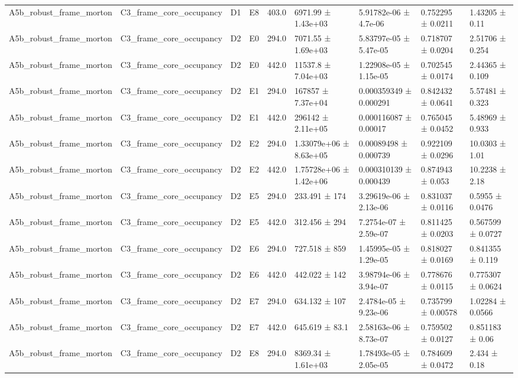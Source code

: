 \begin{table}
\begin{tabular}{lllllllll}
A5b\_robust\_frame\_morton & C3\_frame\_core\_occupancy & D1 & E8 & 403.0 & 6971.99 ± 1.43e+03 & 5.91782e-06 ± 4.7e-06 & 0.752295 ± 0.0211 & 1.43205 ± 0.11 \\
A5b\_robust\_frame\_morton & C3\_frame\_core\_occupancy & D2 & E0 & 294.0 & 7071.55 ± 1.69e+03 & 5.83797e-05 ± 5.47e-05 & 0.718707 ± 0.0204 & 2.51706 ± 0.254 \\
A5b\_robust\_frame\_morton & C3\_frame\_core\_occupancy & D2 & E0 & 442.0 & 11537.8 ± 7.04e+03 & 1.22908e-05 ± 1.15e-05 & 0.702545 ± 0.0174 & 2.44365 ± 0.109 \\
A5b\_robust\_frame\_morton & C3\_frame\_core\_occupancy & D2 & E1 & 294.0 & 167857 ± 7.37e+04 & 0.000359349 ± 0.000291 & 0.842432 ± 0.0641 & 5.57481 ± 0.323 \\
A5b\_robust\_frame\_morton & C3\_frame\_core\_occupancy & D2 & E1 & 442.0 & 296142 ± 2.11e+05 & 0.000116087 ± 0.00017 & 0.765045 ± 0.0452 & 5.48969 ± 0.933 \\
A5b\_robust\_frame\_morton & C3\_frame\_core\_occupancy & D2 & E2 & 294.0 & 1.33079e+06 ± 8.63e+05 & 0.00089498 ± 0.000739 & 0.922109 ± 0.0296 & 10.0303 ± 1.01 \\
A5b\_robust\_frame\_morton & C3\_frame\_core\_occupancy & D2 & E2 & 442.0 & 1.75728e+06 ± 1.42e+06 & 0.000310139 ± 0.000439 & 0.874943 ± 0.053 & 10.2238 ± 2.18 \\
A5b\_robust\_frame\_morton & C3\_frame\_core\_occupancy & D2 & E5 & 294.0 & 233.491 ± 174 & 3.29619e-06 ± 2.13e-06 & 0.831037 ± 0.0116 & 0.5955 ± 0.0476 \\
A5b\_robust\_frame\_morton & C3\_frame\_core\_occupancy & D2 & E5 & 442.0 & 312.456 ± 294 & 7.2754e-07 ± 2.59e-07 & 0.811425 ± 0.0203 & 0.567599 ± 0.0727 \\
A5b\_robust\_frame\_morton & C3\_frame\_core\_occupancy & D2 & E6 & 294.0 & 727.518 ± 859 & 1.45995e-05 ± 1.29e-05 & 0.818027 ± 0.0169 & 0.841355 ± 0.119 \\
A5b\_robust\_frame\_morton & C3\_frame\_core\_occupancy & D2 & E6 & 442.0 & 442.022 ± 142 & 3.98794e-06 ± 3.94e-07 & 0.778676 ± 0.0115 & 0.775307 ± 0.0624 \\
A5b\_robust\_frame\_morton & C3\_frame\_core\_occupancy & D2 & E7 & 294.0 & 634.132 ± 107 & 2.4784e-05 ± 9.23e-06 & 0.735799 ± 0.00578 & 1.02284 ± 0.0566 \\
A5b\_robust\_frame\_morton & C3\_frame\_core\_occupancy & D2 & E7 & 442.0 & 645.619 ± 83.1 & 2.58163e-06 ± 8.73e-07 & 0.759502 ± 0.0127 & 0.851183 ± 0.06 \\
A5b\_robust\_frame\_morton & C3\_frame\_core\_occupancy & D2 & E8 & 294.0 & 8369.34 ± 1.61e+03 & 1.78493e-05 ± 2.05e-05 & 0.784609 ± 0.0472 & 2.434 ± 0.18 \\

\end{tabular}
\end{table}

